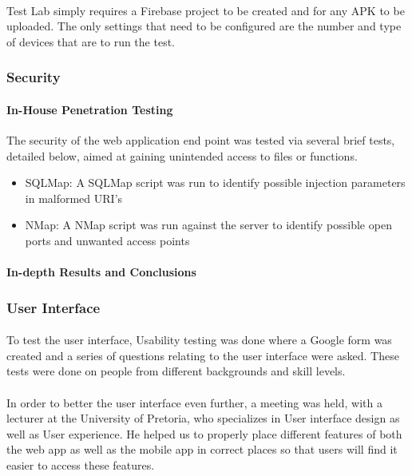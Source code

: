 \documentclass[a4paper, 11pt]{article}
\begin{document}
            \paragraph{}
            Test Lab simply requires a Firebase project to be created and for any APK to be uploaded. The only settings that need to be configured are the number and type of devices that are to run the test.

         \subsubsection{Security}
            \paragraph{In-House Penetration Testing}
            The security of the web application end point was tested via several brief tests, detailed below, aimed at gaining unintended access to files or functions.
            \begin{itemize}
                \item SQLMap: A SQLMap script was run to identify possible injection parameters in malformed URI's
                \item NMap: A NMap script was run against the server to identify possible open ports and unwanted access points
            \end{itemize}
            
            \paragraph{In-depth Results and Conclusions}
        
         \subsubsection{User Interface}
            \paragraph{}
            To test the user interface, Usability testing was done where a Google form was created and a series of questions relating to the user interface were asked. These tests were done on people from different backgrounds and skill levels.
            \paragraph{}
            In order to better the user interface even further, a meeting was held, with a lecturer at the University of Pretoria, who specializes in User interface design as well as User experience. He helped us to properly place different features of both the web app as well as the mobile app in correct places so that users will find it easier to access these features.
\end{document}
